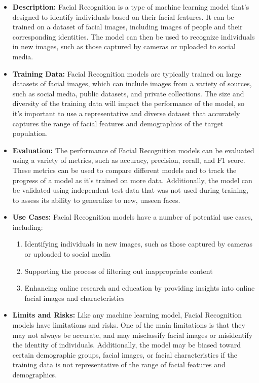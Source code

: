 \begin{itemize}
    \item \textbf{Description:} Facial Recognition is a type of machine learning model that's designed to identify individuals based on their facial features. It can be trained on a dataset of facial images, including images of people and their corresponding identities. The model can then be used to recognize individuals in new images, such as those captured by cameras or uploaded to social media.
    \item \textbf{Training Data:} Facial Recognition models are typically trained on large datasets of facial images, which can include images from a variety of sources, such as social media, public datasets, and private collections. The size and diversity of the training data will impact the performance of the model, so it's important to use a representative and diverse dataset that accurately captures the range of facial features and demographics of the target population.
    \item \textbf{Evaluation:} The performance of Facial Recognition models can be evaluated using a variety of metrics, such as accuracy, precision, recall, and F1 score. These metrics can be used to compare different models and to track the progress of a model as it's trained on more data. Additionally, the model can be validated using independent test data that was not used during training, to assess its ability to generalize to new, unseen faces.
    \item \textbf{Use Cases:} Facial Recognition models have a number of potential use cases, including:
        \begin{enumerate}  
            \item Identifying individuals in new images, such as those captured by cameras or uploaded to social media
            \item Supporting the process of filtering out inappropriate content
            \item Enhancing online research and education by providing insights into online facial images and characteristics
        \end{enumerate}
    \item \textbf{Limits and Risks:} Like any machine learning model, Facial Recognition models have limitations and risks. One of the main limitations is that they may not always be accurate, and may misclassify facial images or misidentify the identity of individuals. Additionally, the model may be biased toward certain demographic groups, facial images, or facial characteristics if the training data is not representative of the range of facial features and demographics.

\end{itemize}
